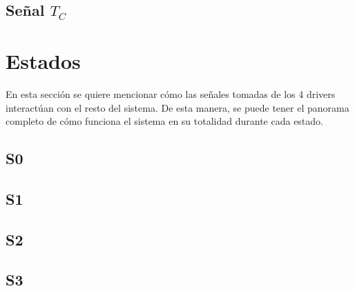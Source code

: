 \documentclass[12pt,onecolumn]{IEEEtran}
\begin{document}
\subsection{Señal $T_C$}


\section{Estados} %

En esta sección se quiere mencionar cómo las señales tomadas de los 4 drivers interactúan con el resto del sistema. De esta manera, se puede tener el panorama completo de cómo funciona el sistema en su totalidad durante cada estado. 

\subsection{S0}



\subsection{S1}

\subsection{S2}

\subsection{S3}
\end{document}
